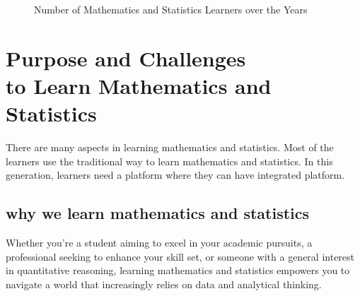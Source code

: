 \documentclass[20pt]{report}
\begin{document}
\begin{figure}
    \centering
    \caption{Number of Mathematics and Statistics Learners over the Years}
\end{figure}


\section{Purpose and Challenges \\ to Learn Mathematics and Statistics}
There are many aspects in learning mathematics and statistics. Most of the learners use the traditional way to learn mathematics and statistics. In this generation, learners need a platform where they can have integrated platform.
\subsection{why we learn mathematics and statistics}
Whether you're a student aiming to excel in your academic pursuits, a professional seeking to enhance your skill set, or someone with a general interest in quantitative reasoning, learning mathematics and statistics empowers you to navigate a world that increasingly relies on data and analytical thinking.
\end{document}
